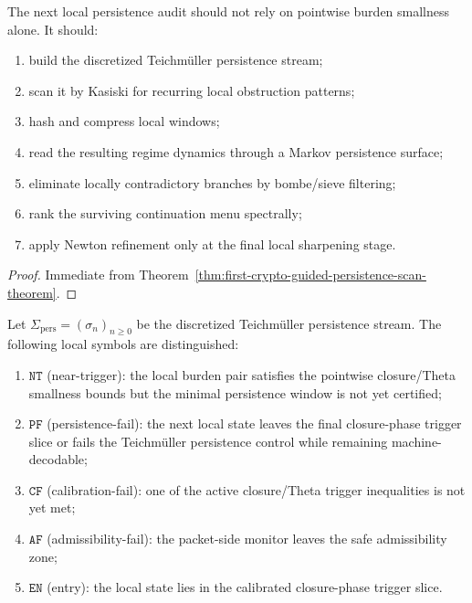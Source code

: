 \begin{corollary}
\label{cor:current-post-r16-persistence-working-rule}
The next local persistence audit should not rely on pointwise burden smallness alone.
It should:
\begin{enumerate}
 \item build the discretized Teichm\"uller persistence stream;
 \item scan it by Kasiski for recurring local obstruction patterns;
 \item hash and compress local windows;
 \item read the resulting regime dynamics through a Markov persistence surface;
 \item eliminate locally contradictory branches by bombe/sieve filtering;
 \item rank the surviving continuation menu spectrally;
 \item apply Newton refinement only at the final local sharpening stage.
\end{enumerate}
\end{corollary}

\begin{proof}
Immediate from Theorem~\ref{thm:first-crypto-guided-persistence-scan-theorem}.
\end{proof}



\begin{definition}
\label{def:local-persistence-symbols}
Let \(\Sigma_{\mathrm{pers}}=(\sigma_n)_{n\ge 0}\) be the discretized Teichm\"uller persistence stream.
The following local symbols are distinguished:
\begin{enumerate}
 \item \(\mathtt{NT}\) (near-trigger): the local burden pair satisfies the pointwise closure/Theta smallness bounds but the minimal persistence window is not yet certified;
 \item \(\mathtt{PF}\) (persistence-fail): the next local state leaves the final closure-phase trigger slice or fails the Teichm\"uller persistence control while remaining machine-decodable;
 \item \(\mathtt{CF}\) (calibration-fail): one of the active closure/Theta trigger inequalities is not yet met;
 \item \(\mathtt{AF}\) (admissibility-fail): the packet-side monitor leaves the safe admissibility zone;
 \item \(\mathtt{EN}\) (entry): the local state lies in the calibrated closure-phase trigger slice.
\end{enumerate}
\end{definition}

